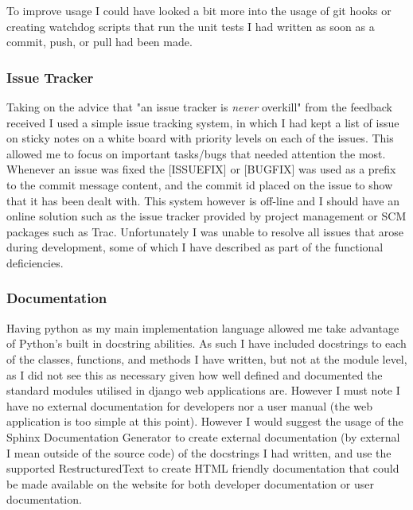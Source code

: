 \documentclass[11pt,a4paper]{article}
\begin{document}
To improve usage I could have looked a bit more into the usage of git hooks or creating watchdog scripts that run the unit tests I had written as soon as a commit, push, or pull had been made.

\subsubsection{Issue Tracker}
Taking on the advice that "an issue tracker is \textit{never} overkill" from the feedback received I used a simple issue tracking system, in which I had kept a list of issue on sticky notes on a white board with priority levels on each of the issues. This allowed me to focus on important tasks/bugs that needed attention the most. Whenever an issue was fixed the [ISSUEFIX] or [BUGFIX] was used as a prefix to the commit message content, and the commit id placed on the issue to show that it has been dealt with. This system however is off-line and I should have an online solution such as the issue tracker provided by project management or SCM packages such as Trac. Unfortunately I was unable to resolve all issues that arose during development, some of which I have described as part of the functional deficiencies. 

\subsubsection{Documentation}
Having python as my main implementation language allowed me take advantage of Python's built in docstring abilities. As such I have included docstrings to each of the classes, functions, and methods I have written, but not at the module level, as I did not see this as necessary given how well defined and documented the standard modules utilised in django web applications are. However I must note I have no external documentation for developers nor a user manual (the web application is too simple at this point). However I would suggest the usage of the Sphinx Documentation Generator to create external documentation (by external I mean outside of the source code) of the docstrings I had written, and use the supported RestructuredText to create HTML friendly documentation that could be made available on the website for both developer documentation or user documentation. 
\end{document}
